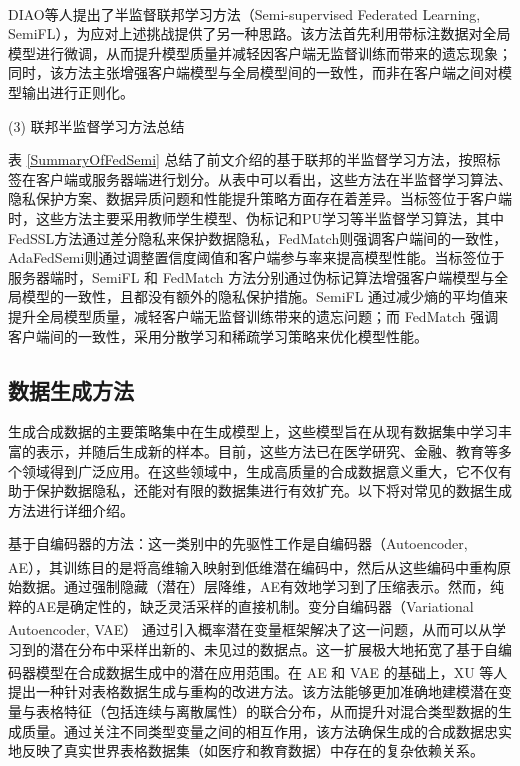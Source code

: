 DIAO\textsuperscript{\cite{diao2022semifl}}等人提出了半监督联邦学习方法（Semi-supervised Federated Learning, SemiFL），为应对上述挑战提供了另一种思路。该方法首先利用带标注数据对全局模型进行微调，从而提升模型质量并减轻因客户端无监督训练而带来的遗忘现象；同时，该方法主张增强客户端模型与全局模型间的一致性，而非在客户端之间对模型输出进行正则化。

(3) 联邦半监督学习方法总结

表 \ref{SummaryOfFedSemi} 总结了前文介绍的基于联邦的半监督学习方法，按照标签在客户端或服务器端进行划分。从表中可以看出，这些方法在半监督学习算法、隐私保护方案、数据异质问题和性能提升策略方面存在着差异。当标签位于客户端时，这些方法主要采用教师学生模型、伪标记和PU学习等半监督学习算法，其中FedSSL方法通过差分隐私来保护数据隐私，FedMatch则强调客户端间的一致性，AdaFedSemi则通过调整置信度阈值和客户端参与率来提高模型性能。当标签位于服务器端时，SemiFL 和 FedMatch 方法分别通过伪标记算法增强客户端模型与全局模型的一致性，且都没有额外的隐私保护措施。SemiFL 通过减少熵的平均值来提升全局模型质量，减轻客户端无监督训练带来的遗忘问题；而 FedMatch 强调客户端间的一致性，采用分散学习和稀疏学习策略来优化模型性能。



\subsection{数据生成方法}
生成合成数据的主要策略集中在生成模型上，这些模型旨在从现有数据集中学习丰富的表示，并随后生成新的样本。目前，这些方法已在医学研究、金融、教育等多个领域得到广泛应用。在这些领域中，生成高质量的合成数据意义重大，它不仅有助于保护数据隐私，还能对有限的数据集进行有效扩充。以下将对常见的数据生成方法进行详细介绍。

基于自编码器的方法：这一类别中的先驱性工作是自编码器（Autoencoder, AE）\textsuperscript{\cite{hinton2006reducing}}，其训练目的是将高维输入映射到低维潜在编码中，然后从这些编码中重构原始数据。通过强制隐藏（潜在）层降维，AE有效地学习到了压缩表示。然而，纯粹的AE是确定性的，缺乏灵活采样的直接机制。变分自编码器（Variational Autoencoder, VAE）\textsuperscript{\cite{kingma2013auto}} 通过引入概率潜在变量框架解决了这一问题，从而可以从学习到的潜在分布中采样出新的、未见过的数据点。这一扩展极大地拓宽了基于自编码器模型在合成数据生成中的潜在应用范围。在 AE 和 VAE 的基础上，XU 等人\textsuperscript{\cite{xu2019modeling}} 提出一种针对表格数据生成与重构的改进方法。该方法能够更加准确地建模潜在变量与表格特征（包括连续与离散属性）的联合分布，从而提升对混合类型数据的生成质量。通过关注不同类型变量之间的相互作用，该方法确保生成的合成数据忠实地反映了真实世界表格数据集（如医疗和教育数据）中存在的复杂依赖关系。


